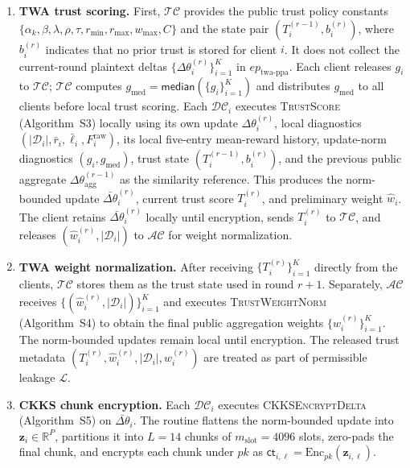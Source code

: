 \documentclass[journal]{IEEEtran}
\begin{document}
\begin{enumerate}
\item \textbf{TWA trust scoring.}
First, $\mathcal{TC}$ provides the public trust policy constants
$\{\alpha_k,\beta,\lambda,\rho,\tau,r_{\min},r_{\max},w_{\max},C\}$
and the state pair $(T_i^{(r-1)},b_i^{(r)})$, where $b_i^{(r)}$ indicates that
no prior trust is stored for client $i$. It does not collect
the current-round plaintext deltas $\{\Delta\theta_i^{(r)}\}_{i=1}^{K}$ in
$ep_{\mathrm{twa\text{-}ppa}}$. Each client releases $g_i$ to $\mathcal{TC}$;
$\mathcal{TC}$ computes $g_{\mathrm{med}}=\mathsf{median}(\{g_i\}_{i=1}^{K})$
and distributes $g_{\mathrm{med}}$ to all clients before local trust scoring.
Each $\mathcal{DC}_i$ executes \textsc{TrustScore} (Algorithm~S3) locally 
using its own update $\Delta\theta_i^{(r)}$, local diagnostics 
$(|\mathcal{D}_i|,\bar{r}_i,\bar{\ell}_i,F_i^{\mathrm{raw}})$, its local
five-entry mean-reward history, update-norm diagnostics
$(g_i,g_{\mathrm{med}})$, trust state $(T_i^{(r-1)},b_i^{(r)})$, and the
previous public aggregate $\Delta\theta_{\mathrm{agg}}^{(r-1)}$ as the 
similarity reference. This produces the norm-bounded update 
$\bar{\Delta\theta}_i^{(r)}$, current trust score $T_i^{(r)}$, and preliminary weight 
$\hat{w}_i$. The client retains $\bar{\Delta\theta}_i^{(r)}$ locally until 
encryption, sends $T_i^{(r)}$ to $\mathcal{TC}$, and releases 
$(\hat{w}_i^{(r)},|\mathcal{D}_i|)$ to $\mathcal{AC}$ for weight normalization.

\item \textbf{TWA weight normalization.}
After receiving $\{T_i^{(r)}\}_{i=1}^{K}$ directly from the clients,
$\mathcal{TC}$ stores them as the trust state used in round $r+1$.
Separately, $\mathcal{AC}$ receives
$\{(\hat{w}_i^{(r)},|\mathcal{D}_i|)\}_{i=1}^{K}$ and executes
\textsc{TrustWeightNorm} (Algorithm~S4) to obtain the final public
aggregation weights $\{w_i^{(r)}\}_{i=1}^{K}$. The norm-bounded updates
remain local until encryption. The released trust metadata
$(T_i^{(r)}, \hat{w}_i^{(r)}, |\mathcal{D}_i|, w_i^{(r)})$
are treated as part of permissible leakage $\mathcal{L}$.

\item \textbf{CKKS chunk encryption.}
Each $\mathcal{DC}_i$ executes \textsc{CKKSEncryptDelta}
(Algorithm~S5) on $\bar{\Delta\theta}_i$. The routine flattens
the norm-bounded update into $\mathbf{z}_i\in\mathbb{R}^{P}$, partitions it into
$L=14$ chunks of $m_{\mathrm{slot}}=4096$ slots, zero-pads the final chunk, and
encrypts each chunk under $pk$ as
$\mathsf{ct}_{i,\ell}=\mathrm{Enc}_{pk}(\mathbf{z}_{i,\ell})$.


\end{enumerate}
\end{document}

